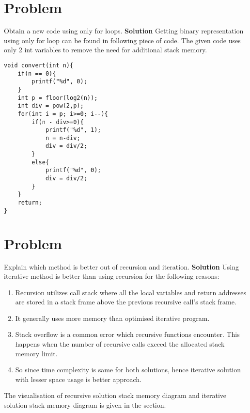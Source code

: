 \documentclass[journal,12pt,twocolumn]{IEEEtran}
\begin{document}
\section{Problem}
Obtain a new code using only for loops.
\newline
\textbf{Solution}
\newline
Getting binary representation using only for loop can be found in following piece of code.
The given code uses only 2 int variables to remove the need for additional stack memory.
\newpage
\begin{lstlisting}
void convert(int n){
    if(n == 0){
        printf("%d", 0);
    }
    int p = floor(log2(n));
    int div = pow(2,p);
    for(int i = p; i>=0; i--){
        if(n - div>=0){
            printf("%d", 1);
            n = n-div;
            div = div/2;
        }
        else{
            printf("%d", 0);
            div = div/2;
        }
    }
    return;
}
\end{lstlisting}
\setcounter{figure}{0}

\section{Problem}
Explain which method is better out of recursion and iteration.
\newline
\textbf{Solution}
\newline
Using iterative method is better than using recursion for the following reasons:
\begin{enumerate}
  \item Recursion utilizes call stack where all the local variables and return addresses are stored in a stack frame above the previous recursive call's stack frame.
  \item It generally uses more memory than optimised iterative program.
  \item Stack overflow is a common error which recursive functions encounter. This happens when the number of recursive calls exceed the allocated stack memory limit.
  \item So since time complexity is same for both solutions, hence iterative solution with lesser space usage is better approach.
\end{enumerate}
The visualisation of recursive solution stack memory diagram and iterative solution stack memory diagram is given in the 
 section.

\newpage
\setcounter{figure}{0}
\end{document}
